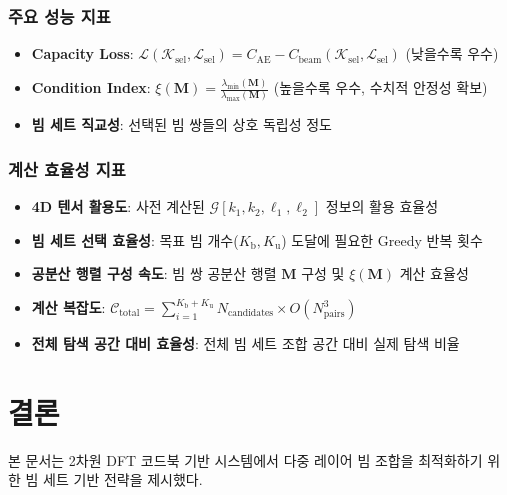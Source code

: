\documentclass[10pt]{article}
\begin{document}
\subsubsection{주요 성능 지표}
\begin{itemize}
    \item \textbf{Capacity Loss}: $\mathcal{L}(\mathcal{K}_{\text{sel}}, \mathcal{L}_{\text{sel}}) = C_{\text{AE}} - C_{\text{beam}}(\mathcal{K}_{\text{sel}}, \mathcal{L}_{\text{sel}})$ (낮을수록 우수)
    \item \textbf{Condition Index}: $\xi(\mathbf{M}) = \frac{\lambda_{\min}(\mathbf{M})}{\lambda_{\max}(\mathbf{M})}$ (높을수록 우수, 수치적 안정성 확보)
    \item \textbf{빔 세트 직교성}: 선택된 빔 쌍들의 상호 독립성 정도
\end{itemize}

\subsubsection{계산 효율성 지표}
\begin{itemize}
    \item \textbf{4D 텐서 활용도}: 사전 계산된 $\mathcal{G}[k_1, k_2, \ell_1, \ell_2]$ 정보의 활용 효율성
    \item \textbf{빔 세트 선택 효율성}: 목표 빔 개수($K_{\text{b}}, K_{\text{u}}$) 도달에 필요한 Greedy 반복 횟수
    \item \textbf{공분산 행렬 구성 속도}: 빔 쌍 공분산 행렬 $\mathbf{M}$ 구성 및 $\xi(\mathbf{M})$ 계산 효율성
    \item \textbf{계산 복잡도}: $\mathcal{C}_{\text{total}} = \sum_{i=1}^{K_{\text{b}}+K_{\text{u}}} N_{\text{candidates}} \times O(N_{\text{pairs}}^3)$
    \item \textbf{전체 탐색 공간 대비 효율성}: 전체 빔 세트 조합 공간 대비 실제 탐색 비율
\end{itemize}

\section{결론}
\label{sec:conclusion}
본 문서는 2차원 DFT 코드북 기반 시스템에서 다중 레이어 빔 조합을 최적화하기 위한 빔 세트 기반 전략을 제시했다.
\end{document}
